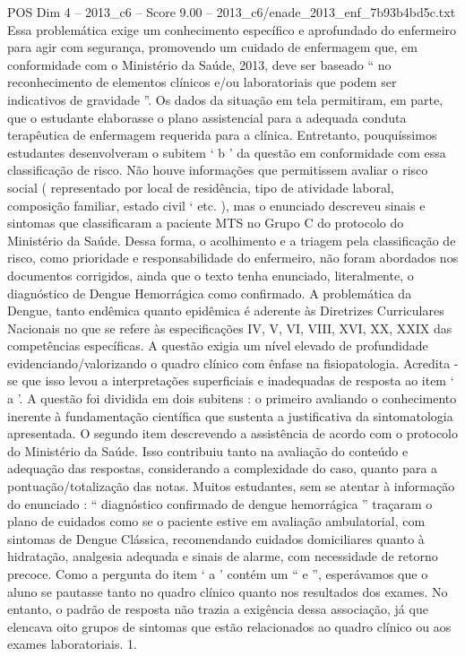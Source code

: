 \begin{textsample}{POS Dim 4 – 2013\_c6 – Score 9.00 – 2013\_c6/enade\_2013\_enf\_7b93b4bd5c.txt}
Essa problemática exige um conhecimento específico e aprofundado do enfermeiro para agir com segurança, promovendo um cuidado de enfermagem que, em conformidade com o Ministério da Saúde, 2013, deve ser baseado “ no reconhecimento de elementos clínicos e/ou laboratoriais que podem ser indicativos de gravidade ”.
Os dados da situação em tela permitiram, em parte, que o estudante elaborasse o plano assistencial para a adequada conduta terapêutica de enfermagem requerida para a clínica.
Entretanto, pouquíssimos estudantes desenvolveram o subitem ‘ b ’ da questão em conformidade com essa classificação de risco.
Não houve informações que permitissem avaliar o risco social ( representado por local de residência, tipo de atividade laboral, composição familiar, estado civil ‘ etc. ), mas o enunciado descreveu sinais e sintomas que classificaram a paciente MTS no Grupo C do protocolo do Ministério da Saúde.
Dessa forma, o acolhimento e a triagem pela classificação de risco, como prioridade e responsabilidade do enfermeiro, não foram abordados nos documentos corrigidos, ainda que o texto tenha enunciado, literalmente, o diagnóstico de Dengue Hemorrágica como confirmado.
A problemática da Dengue, tanto endêmica quanto epidêmica é aderente às Diretrizes Curriculares Nacionais no que se refere às especificações IV, V, VI, VIII, XVI, XX, XXIX das competências específicas.
A questão exigia um nível elevado de profundidade evidenciando/valorizando o quadro clínico com ênfase na fisiopatologia.
Acredita -se que isso levou a interpretações superficiais e inadequadas de resposta ao item ‘ a ’.
A questão foi dividida em dois subitens : o primeiro avaliando o conhecimento inerente à fundamentação científica que sustenta a justificativa da sintomatologia apresentada.
O segundo item descrevendo a assistência de acordo com o protocolo do Ministério da Saúde.
Isso contribuiu tanto na avaliação do conteúdo e adequação das respostas, considerando a complexidade do caso, quanto para a pontuação/totalização das notas.
Muitos estudantes, sem se atentar à informação do enunciado : “ diagnóstico confirmado de dengue hemorrágica ” traçaram o plano de cuidados como se o paciente estive em avaliação ambulatorial, com sintomas de Dengue Clássica, recomendando cuidados domiciliares quanto à hidratação, analgesia adequada e sinais de alarme, com necessidade de retorno precoce.
Como a pergunta do item ‘ a ’ contém um “ e ”, esperávamos que o aluno se pautasse tanto no quadro clínico quanto nos resultados dos exames.
No entanto, o padrão de resposta não trazia a exigência dessa associação, já que elencava oito grupos de sintomas que estão relacionados ao quadro clínico ou aos exames laboratoriais. 1.

\end{textsample}

